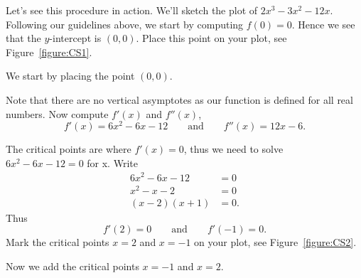 Let's see this procedure in action. We'll sketch the plot of
$2x^3-3x^2-12x$.  Following our guidelines above, we start by
computing $f(0) = 0$.  Hence we see that the $y$-intercept is
$(0,0)$. Place this point on your plot, see Figure~\ref{figure:CS1}.
\begin{marginfigure}[-2.5in]
\caption{We start by placing the point $(0,0)$.}
\label{figure:CS1}
\end{marginfigure}

Note that there are no vertical asymptotes as our function is defined
for all real numbers.  Now compute $f'(x)$ and $f''(x)$,
\[
f'(x) = 6x^2 -6x -12\qquad\text{and}\qquad f''(x) = 12x-6.
\]

The critical points are where $f'(x) = 0$, thus we need to solve $6x^2
-6x -12 = 0$ for x. Write
\begin{align*}
6x^2 -6x -12 &= 0 \\
x^2 - x -2 &=0\\
(x-2)(x+1) &=0.
\end{align*}
Thus
\[
f'(2) = 0\qquad\text{and}\qquad f'(-1) = 0.
\]
Mark the critical points $x=2$ and $x=-1$ on your plot, see
Figure~\ref{figure:CS2}.
\begin{marginfigure}[-3in]
\caption{Now we add the critical points $x=-1$ and $x=2$.}
\label{figure:CS2}
\end{marginfigure}

